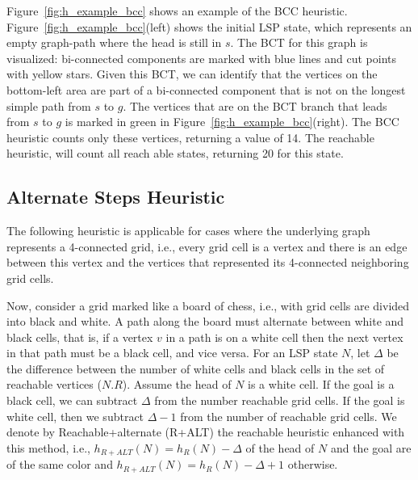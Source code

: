 \documentclass[letterpaper]{article} %
\newcommand\Yossi[1]{\nb{\textbf{Yossi:}}{green}{#1}}
\newcommand\Roni[1]{\nb{\textbf{Roni:}}{blue}{#1}}
\begin{document}
Figure~\ref{fig:h_example_bcc} shows an example of the BCC heuristic.
Figure~\ref{fig:h_example_bcc}(left) shows the initial LSP state, which represents an empty graph-path where the head is still in $s$. The BCT for this graph is visualized: bi-connected components are marked with blue lines and cut points with yellow stars.
Given this BCT, we can identify that the vertices on the bottom-left area are part of a bi-connected component that is not on the longest simple path from $s$ to $g$.
The vertices that are on the BCT branch that leads from $s$ to $g$ is marked in green in Figure~\ref{fig:h_example_bcc}(right). The BCC heuristic counts only these vertices, returning a value of 14. The reachable heuristic, will count all reach able states, returning 20 for this state.

\subsection{Alternate Steps Heuristic}

The following heuristic is applicable for cases where the underlying graph
represents a 4-connected grid, i.e., every grid cell is a vertex and there is an edge between this vertex and the vertices that represented its 4-connected neighboring grid cells.


Now, consider a grid marked like a board of chess, i.e., with grid cells are divided into black and white. A path along the board must alternate between white and black cells, that is,
if a vertex $v$ in a path is on a white cell then the next vertex in that path must be a black cell, and vice versa. For an LSP state $N$, let $\Delta$ be the difference between the number of white cells and black cells in the set of reachable vertices ($N.R$).
Assume the head of $N$ is a white cell. If the goal is a black cell, we can subtract $\Delta$ from the number reachable grid cells. If the goal is white cell, then we subtract $\Delta - 1$
from the number of reachable grid cells.
We denote by Reachable+alternate (R+ALT) the reachable heuristic enhanced with this method,
i.e., $h_{R+ALT}(N)=h_R(N)-\Delta$ of the head of $N$ and the goal are of the same color
and $h_{R+ALT}(N)=h_R(N)-\Delta+1$ otherwise.

\end{document}

